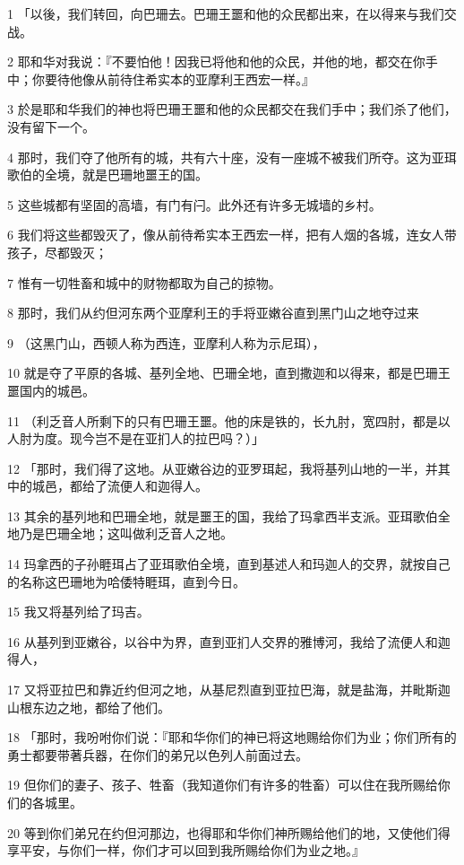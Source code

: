 \par 1 「以後，我们转回，向巴珊去。巴珊王噩和他的众民都出来，在以得来与我们交战。
\par 2 耶和华对我说：『不要怕他！因我已将他和他的众民，并他的地，都交在你手中；你要待他像从前待住希实本的亚摩利王西宏一样。』
\par 3 於是耶和华我们的神也将巴珊王噩和他的众民都交在我们手中；我们杀了他们，没有留下一个。
\par 4 那时，我们夺了他所有的城，共有六十座，没有一座城不被我们所夺。这为亚珥歌伯的全境，就是巴珊地噩王的国。
\par 5 这些城都有坚固的高墙，有门有闩。此外还有许多无城墙的乡村。
\par 6 我们将这些都毁灭了，像从前待希实本王西宏一样，把有人烟的各城，连女人带孩子，尽都毁灭；
\par 7 惟有一切牲畜和城中的财物都取为自己的掠物。
\par 8 那时，我们从约但河东两个亚摩利王的手将亚嫩谷直到黑门山之地夺过来
\par 9 （这黑门山，西顿人称为西连，亚摩利人称为示尼珥），
\par 10 就是夺了平原的各城、基列全地、巴珊全地，直到撒迦和以得来，都是巴珊王噩国内的城邑。
\par 11 （利乏音人所剩下的只有巴珊王噩。他的床是铁的，长九肘，宽四肘，都是以人肘为度。现今岂不是在亚扪人的拉巴吗？）」
\par 12 「那时，我们得了这地。从亚嫩谷边的亚罗珥起，我将基列山地的一半，并其中的城邑，都给了流便人和迦得人。
\par 13 其余的基列地和巴珊全地，就是噩王的国，我给了玛拿西半支派。亚珥歌伯全地乃是巴珊全地；这叫做利乏音人之地。
\par 14 玛拿西的子孙睚珥占了亚珥歌伯全境，直到基述人和玛迦人的交界，就按自己的名称这巴珊地为哈倭特睚珥，直到今日。
\par 15 我又将基列给了玛吉。
\par 16 从基列到亚嫩谷，以谷中为界，直到亚扪人交界的雅博河，我给了流便人和迦得人，
\par 17 又将亚拉巴和靠近约但河之地，从基尼烈直到亚拉巴海，就是盐海，并毗斯迦山根东边之地，都给了他们。
\par 18 「那时，我吩咐你们说：『耶和华你们的神已将这地赐给你们为业；你们所有的勇士都要带著兵器，在你们的弟兄以色列人前面过去。
\par 19 但你们的妻子、孩子、牲畜（我知道你们有许多的牲畜）可以住在我所赐给你们的各城里。
\par 20 等到你们弟兄在约但河那边，也得耶和华你们神所赐给他们的地，又使他们得享平安，与你们一样，你们才可以回到我所赐给你们为业之地。』
